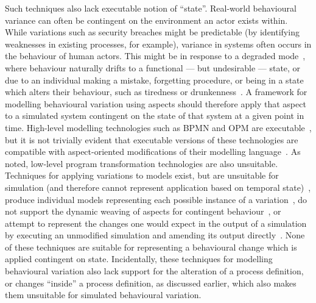 Such techniques also lack executable notion of ``state''. Real-world behavioural
variance can often be contingent on the environment an actor exists within.
While variations such as security breaches might be predictable (by identifying
weaknesses in existing processes, for example), variance in \sociotechnical
systems often occurs in the behaviour of human actors. This might be in response
to a degraded mode~\cite{johnson2007degradedmodes}, where behaviour naturally
drifts to a functional --- but undesirable --- state, or due to an individual
making a mistake, forgetting procedure, or being in a state which alters their
behaviour, such as tiredness or drunkenness~\cite{aranTheatreThesis}. A
framework for modelling behavioural variation using aspects should therefore
apply that aspect to a simulated system contingent on the state of that system
at a given point in time. High-level modelling technologies such as BPMN and OPM
are executable~\cite{ExecutableBPMNMitsyuk,opm_original}, but it is not trivially
evident that executable versions of these technologies are compatible with
aspect-oriented modifications of their modelling
language~\cite{charfi2010AO4BPMN,Cappelli_AOBPM}. As noted, low-level program
transformation technologies are also unsuitable. Techniques for applying
variations to models exist, but are unsuitable for simulation (and therefore
cannot represent application based on temporal state)~\cite{stocker2013secsy},
produce individual models representing each possible instance of a
variation~\cite{pourmasoumi2015business}, do not support the dynamic weaving of
aspects for contingent behaviour~\cite{Machado_2011}, or attempt to represent
the changes one would expect in the output of a simulation by executing an
unmodified simulation and amending its output
directly~\cite{shugurov2014generation}. None of these techniques are suitable
for representing a behavioural change which is applied contingent on state.
Incidentally, these techniques for modelling behavioural variation also lack
support for the alteration of a process definition, or changes ``inside'' a
process definition, as discussed earlier, which also makes them unsuitable for
simulated behavioural variation.


